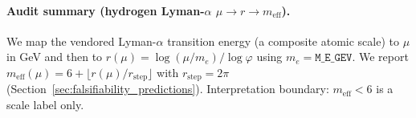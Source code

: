 \paragraph{Audit summary (hydrogen Lyman-$\alpha$ $\mu\to r\to m_{\mathrm{eff}}$).} \AuditTag We map the vendored Lyman-$\alpha$ transition energy (a composite atomic scale) to $\mu$ in GeV and then to $r(\mu)=\log(\mu/m_e)/\log\varphi$ using $m_e=\texttt{M\_E\_GEV}$. We report $m_{\mathrm{eff}}(\mu)=6+\lfloor r(\mu)/r_{\mathrm{step}}\rfloor$ with $r_{\mathrm{step}}=2\pi$ (Section~\ref{sec:falsifiability_predictions}). Interpretation boundary: $m_{\mathrm{eff}}<6$ is a scale label only.
